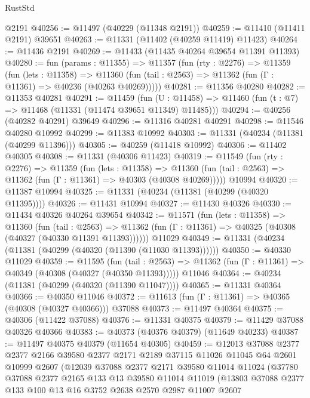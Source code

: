 \begin{lexlean}{RustStd}
\begin{coremodule}
    @2191
@40256 := @11497 (@40229 (@11348 @2191))
@40259 := @11410 (@11411 @2191) @39651
@40263 := @11331 (@11402 (@40259 @11419) @11423)
@40264 := @11436 @2191
@40269 := @11433 (@11435 @40264 @39654 @11391 @11393)
@40280 := fun (params : @11355) =>
  @11357
    (fun (rty : @2276) =>
    @11359
      (fun (lets : @11358) =>
      @11360 (fun (tail : @2563) => @11362 (fun (Γ : @11361) => @40236 (@40263 @40269)))))
@40281 := @11356 @40280
@40282 := @11353 @40281
@40291 := @11459
    (fun (U : @11458) => @11460 (fun (t : @7) => @11468 (@11331 (@11474 @39651 @11349) @11485)))
@40294 := @40256 (@40282 @40291) @39649
@40296 := @11316 @40281 @40291
@40298 := @11546 @40280 @10992
@40299 := @11383 @10992
@40303 := @11331 (@40234 (@11381 (@40299 @11396)))
@40305 := @40259 (@11418 @10992)
@40306 := @11402 @40305
@40308 := @11331 (@40306 @11423)
@40319 := @11549
    (fun (rty : @2276) =>
    @11359
      (fun (lets : @11358) =>
      @11360 (fun (tail : @2563) => @11362 (fun (Γ : @11361) => @40303 (@40308 @40269)))))
    @10994
@40320 := @11387 @10994
@40325 := @11331 (@40234 (@11381 (@40299 (@40320 @11395))))
@40326 := @11431 @10994
@40327 := @11430 @40326
@40330 := @11434 @40326 @40264 @39654
@40342 := @11571
    (fun (lets : @11358) =>
    @11360
      (fun (tail : @2563) =>
      @11362 (fun (Γ : @11361) => @40325 (@40308 (@40327 (@40330 @11391 @11393))))))
    @11029
@40349 := @11331 (@40234 (@11381 (@40299 (@40320 (@11390 (@11030 @11393))))))
@40350 := @40330 @11029
@40359 := @11595
    (fun (tail : @2563) => @11362 (fun (Γ : @11361) => @40349 (@40308 (@40327 (@40350 @11393)))))
    @11046
@40364 := @40234 (@11381 (@40299 (@40320 (@11390 @11047))))
@40365 := @11331 @40364
@40366 := @40350 @11046
@40372 := @11613 (fun (Γ : @11361) => @40365 (@40308 (@40327 @40366))) @37088
@40373 := @11497 @40364
@40375 := @40306 (@11422 @37088)
@40376 := @11331 @40375
@40379 := @11429 @37088 @40326 @40366
@40383 := @40373 (@40376 @40379) (@11649 @40233)
@40387 := @11497 @40375 @40379 (@11654 @40305)
@40459 := @12013
    @37088
    @2377
    @2377
    @2166
    @39580
    @2377
    @2171
    @2189
    @37115
    @11026
    @11045
    @64
    @2601
    @10999
    @2607
    (@12039
      @37088
      @2377
      @2171
      @39580
      @11014
      @11024
      (@37780
        @37088
        @2377
        @2165
        @133
        @13
        @39580
        @11014
        @11019
        (@13803
          @37088
          @2377
          @133
          @100
          @13
          @16
          @3752
          @2638
          @2570
          @2987
          @11007
          @2607

\end{coremodule}
\end{lexlean}
